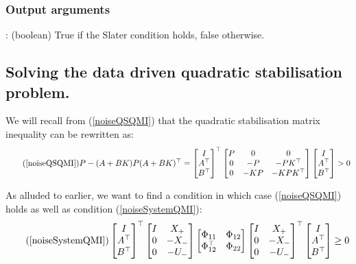 \subsubsection*{Output arguments}
\textbf{}: (boolean) True if the Slater condition holds, false otherwise.


\subsection{Solving the data driven quadratic stabilisation problem.}
We will recall from (\ref{noiseQSQMI}) that the quadratic stabilisation matrix inequality can be rewritten as:
\begin{equation} \tag{\ref{noiseQSQMI}}
P - (A + BK) P (A + BK)^\top = 
\begin{bmatrix} I\\A^\top\\B^\top \end{bmatrix}^\top 
\begin{bmatrix} P&0&0\\0&-P&-PK^\top\\0&-KP&-KPK^\top \end{bmatrix} 
\begin{bmatrix} I\\A^\top\\B^\top \end{bmatrix} > 0
\end{equation}

As alluded to earlier, we want to find a condition in which case (\ref{noiseQSQMI}) holds as well as condition (\ref{noiseSystemQMI}):
\begin{equation} \tag{\ref{noiseSystemQMI}}
\begin{bmatrix} I \\ A^\top \\ B^\top \end{bmatrix}^\top
\begin{bmatrix} I&X_+ \\ 0 & -X_- \\ 0&-U_- \end{bmatrix}
\begin{bmatrix} \Phi_{11} & \Phi_{12} \\ \Phi_{12}^\top & \Phi_{22} \end{bmatrix}
\begin{bmatrix} I&X_+ \\ 0 & -X_- \\ 0&-U_- \end{bmatrix}^\top
\begin{bmatrix} I \\ A^\top \\ B^\top \end{bmatrix} \geq 0
\end{equation}

